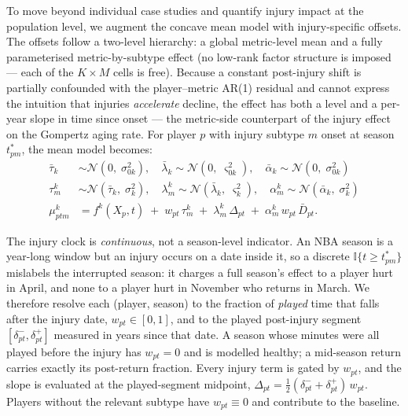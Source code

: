 To move beyond individual case studies and quantify injury impact at the population level, we augment the concave mean model with injury-specific offsets.  The offsets follow a two-level hierarchy: a global metric-level mean and a fully parameterised metric-by-subtype effect (no low-rank factor structure is imposed --- each of the $K \times M$ cells is free).  Because a constant post-injury shift is partially confounded with the player--metric AR(1) residual and cannot express the intuition that injuries \emph{accelerate} decline, the effect has both a level and a per-year slope in time since onset --- the metric-side counterpart of the injury effect on the Gompertz aging rate.  For player $p$ with injury subtype $m$ onset at season $t^{*}_{pm}$, the mean model becomes:
\begin{align}
    \bar{\tau}_k &\sim \mathcal{N}(0,\; \sigma^2_{0k}), \quad \bar{\lambda}_k \sim \mathcal{N}(0,\; \varsigma^2_{0k}), \quad \bar{\alpha}_k \sim \mathcal{N}(0,\; \sigma^2_{0k}) \\
    \tau^k_{m} &\sim \mathcal{N}(\bar{\tau}_k,\; \sigma^2_{k}), \quad \lambda^k_{m} \sim \mathcal{N}(\bar{\lambda}_k,\; \varsigma^2_{k}), \quad \alpha^k_{m} \sim \mathcal{N}(\bar{\alpha}_k,\; \sigma^2_{k}) \\
    \mu^k_{ptm} &= f^k(X_p,t) \;+\; w_{pt}\,\tau^k_{m} \;+\; \lambda^k_{m}\,\Delta_{pt} \;+\; \alpha^k_{m}\,w_{pt}\,\bar{D}_{pt}.
\end{align}

The injury clock is \emph{continuous}, not a season-level indicator.  An NBA season is a year-long
window but an injury occurs on a date inside it, so a discrete $\mathbb{I}\{t \ge t^{*}_{pm}\}$
mislabels the interrupted season: it charges a full season's effect to a player hurt in April, and
none to a player hurt in November who returns in March.  We therefore resolve each (player, season)
to the fraction of \emph{played} time that falls after the injury date, $w_{pt} \in [0,1]$, and to
the played post-injury segment $[\delta^{-}_{pt}, \delta^{+}_{pt}]$ measured in years since that
date.  A season whose minutes were all played before the injury has $w_{pt}=0$ and is modelled
healthy; a mid-season return carries exactly its post-return fraction.  Every injury term is gated
by $w_{pt}$, and the slope is evaluated at the played-segment midpoint,
$\Delta_{pt} = \tfrac{1}{2}(\delta^{-}_{pt}+\delta^{+}_{pt})\,w_{pt}$.  Players without the relevant
subtype have $w_{pt} \equiv 0$ and contribute to the baseline.

